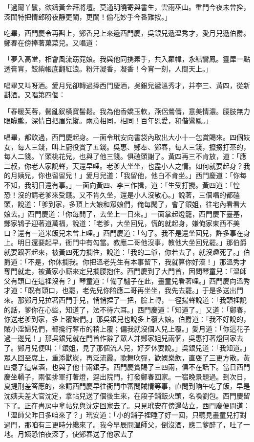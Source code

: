 「過爾丫鬟，欲鑄黃金拜將壇。莫通明曉寄與書生，雲雨巫山。重門今夜未曾拴，深閨特把情郎盼夜靜更闌，更闌！偷花妙手今番難按。」

吃畢，西門慶令再斟上，鄭香兒上來遞西門慶，吳銀兒遞溫秀才，愛月兒遞伯爵。鄭春在傍捧著菓菜兒。又唱道：

「夢入高堂，相會風流窈窕娘。我與他同携素手，共入羅幃，永結鸞鳳。靈犀一點透膏肓，鮫綃帳底翻紅浪。粉汗凝香，凝香！今宵一刻，人間天上。」

唱畢又叫呀酒。愛月兒卻轉過捧西門慶酒，吳銀兒遞溫秀才，并李三、黃四，從新斟酒。又唱第四個：

「春暖芙蓉，鬢亂釵橫寶髻鬆。我為他香嬌玉軟，燕侶鶯儔，意美情濃。腰肢無力眼矇朧，深情自把眉兒縱。兩意相同，相同！百年恩愛，和偕鸞鳳。」

唱畢，都飲過，西門慶起身。一面令玳安向書袋內取出大小十一包賞賜來。四個妓女，每人三錢，叫上廚役賞了五錢。吳惠、鄭奉、鄭春，每人三錢，攛掇打茶的，每人二錢。丫頭桃花兒，也與了他三錢。俱磕頭謝了。黃四再三不肯放，道：「應二叔，你老人家說聲，天還早哩。老爹大坐坐，也盡小人之情。如何就要起身？我的月姨兒，你也留留兒！」愛月兒道：「我留他，他白不肯坐。」西門慶道：「你每不知，我明日還有事。」一面向黃四、李三作揖，道：「生受打攪。黃四道：「惶恐！沒的請老爹來受餓。又不肯久坐，還是小人沒敬心。」說著，三個唱的都磕頭，說道：「爹到家，多頂上大娘和眾娘們，俺每閑了，會了銀姐，往宅內看看大娘去。」西門慶道：「你每閒了，去坐上一日來。」一面掌起燈籠，西門慶下臺基，鄭家鴇子迎著道萬福，說道：「老爹，大坐回兒，慌的就起身，嫌俺家東西不美口？還有一道米飯兒未曾上哩。」西門慶道：「勾了。我不是還坐回兒，許多事在身上。明日還要起早，衙門中有勾當。教應二哥他沒事，教他大坐回兒罷。」那伯爵就要跟著起來，被黃四死力攔住，說道：「我的二爺，你若去了，就沒趣死了。」伯爵道：「不是，你休攔我。你把溫老先生有本事留下，我就算你好漢！」那溫秀才奪門就走，被黃家小廝來定兒攔腰抱住。西門慶到了大門首，因問琴童兒：「溫師父有頭口在這裡沒有？」琴童道：「備了驢子在此，畫童兒看著哩。」西門慶向溫秀才道：「既有頭口，也罷，老先兒你陪應二哥再坐坐，我先去罷。」于是多送出門來。那鄭月兒拉著西門手兒，悄悄捏了一把，臉上轉，一徑揚聲說道：「我頭裡說的話，爹你在心些，知道了，法不待六耳。」西門慶道：「知道了。」又道：「鄭春，你送老爹到家，多上覆娘們。」那吳銀兒也說多上覆大娘。伯爵道：「我不好說的，賊小淫婦兒們，都攙行奪市的稍上覆；偏我就沒個人兒上覆。」愛月道：「你這花子過一邊兒！」那吳銀兒就在門首作辭了眾人并鄭家姐兒兩個，吳惠打著燈回家去了。鄭月兒便叫：「銀姐，見了那個流人兒，好歹休要說。」吳銀兒道：「我知道。」眾人回至席上，重添獸炭，再泛流霞。歌舞吹彈，歡娛樂飲，直耍了三更方散。黃四擺了這席酒，也與了他十兩銀子。西門慶賞賜了三四兩，俱不在話下。當日西門慶坐轎子，兩個排軍打著燈，逕出院門，打發鄭春回家。一宿晚景題過。到次日，夏提刑差答應的，來請西門慶早往衙門中審問賊情等事，直問到晌午吃了飯，早是沈姨夫差大官沈定，拿帖兒送了個後生來，在段子舖飯火頭，名喚劉包。西門慶留下了。正在書房中拿帖兒與沈定回家去了。只見玳安在傍邊站立，西門慶便問道：「溫師父昨日多咱來了？」玳安道：「小的舖子裡睡了好一回，只聽見畫童兒打對過門，那咱有三更時分纔來了。我今早辰問溫師父，倒沒酒，應二爹醉了，吐了一地。月姨恐怕夜深了，使鄭春送了他家去了